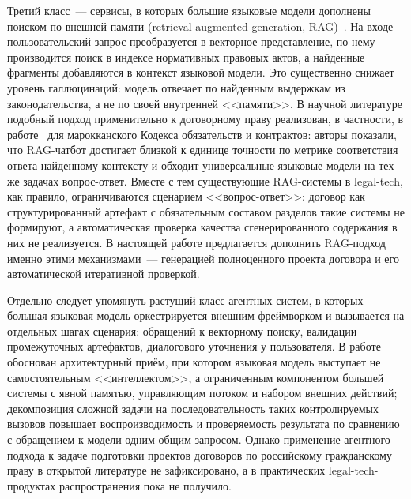 Третий класс~--- сервисы, в которых большие языковые модели дополнены поиском по внешней памяти (retrieval-augmented generation, RAG)~\cite{lewis2020rag,gao2023ragsurvey}. На входе пользовательский запрос преобразуется в векторное представление, по нему производится поиск в индексе нормативных правовых актов, а найденные фрагменты добавляются в контекст языковой модели. Это существенно снижает уровень галлюцинаций: модель отвечает по найденным выдержкам из законодательства, а не по своей внутренней <<памяти>>. В научной литературе подобный подход применительно к договорному праву реализован, в частности, в работе~\cite{amazou2025legalrag} для марокканского Кодекса обязательств и контрактов: авторы показали, что RAG-чатбот достигает близкой к единице точности по метрике соответствия ответа найденному контексту и обходит универсальные языковые модели на тех же задачах вопрос-ответ. Вместе с тем существующие RAG-системы в legal-tech, как правило, ограничиваются сценарием <<вопрос-ответ>>: договор как структурированный артефакт с обязательным составом разделов такие системы не формируют, а автоматическая проверка качества сгенерированного содержания в них не реализуется. В настоящей работе предлагается дополнить RAG-подход именно этими механизмами~--- генерацией полноценного проекта договора и его автоматической итеративной проверкой.

Отдельно следует упомянуть растущий класс агентных систем, в которых большая языковая модель оркестрируется внешним фреймворком и вызывается на отдельных шагах сценария: обращений к векторному поиску, валидации промежуточных артефактов, диалогового уточнения у пользователя. В работе~\cite{sumers2024cognitive} обоснован архитектурный приём, при котором языковая модель выступает не самостоятельным <<интеллектом>>, а ограниченным компонентом большей системы с явной памятью, управляющим потоком и набором внешних действий; декомпозиция сложной задачи на последовательность таких контролируемых вызовов повышает воспроизводимость и проверяемость результата по сравнению с обращением к модели одним общим запросом. Однако применение агентного подхода к задаче подготовки проектов договоров по российскому гражданскому праву в открытой литературе не зафиксировано, а в практических legal-tech-продуктах распространения пока не получило.

